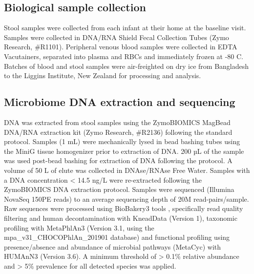 \documentclass{article}
\begin{document}
\subsection{Biological sample collection}
Stool samples were collected from each infant at their home at the baseline visit.
Samples were collected in DNA/RNA Shield Fecal Collection Tubes (Zymo Research, \#R1101).
Peripheral venous blood samples were collected in EDTA Vacutainers, separated into plasma and RBCs and immediately frozen at -80 C.
Batches of blood and stool samples were air-freighted on dry ice from Bangladesh to the Liggins Institute, New Zealand for processing and analysis. 

\subsection{Microbiome DNA extraction and sequencing}
DNA was extracted from stool samples using the ZymoBIOMICS MagBead DNA/RNA extraction kit (Zymo Research, \#R2136) following the standard protocol.
Samples (1 mL) were mechanically lysed in bead bashing tubes using the MiniG tissue homogenizer prior to extraction of DNA.
200 µL of the sample was used post-bead bashing for extraction of DNA following the protocol.
A volume of 50 \textmu{} L of elute was collected in DNAse/RNAse Free Water.
Samples with a DNA concentration \textless{} 14.5 ng/\textmu{}L were re-extracted following the ZymoBIOMICS DNA extraction protocol.
Samples were sequenced (Illumina NovaSeq 150PE reads) to an average sequencing depth of 20M read-pairs/sample.
Raw sequences were processed using BioBakery3 tools \cite{beghini2021integrating}, specifically read quality filtering and human decontamination with KneadData (Version 1), taxonomic profiling with MetaPhlAn3 (Version 3.1, using the mpa\_v31\_CHOCOPhlAn\_201901 database) and functional profiling using presence/absence and abundance of microbial pathways (MetaCyc) with HUMAnN3 (Version 3.6).
A minimum threshold of \textgreater{} 0.1\% relative abundance and \textgreater{} 5\% prevalence for all detected species was applied. 
\end{document}
